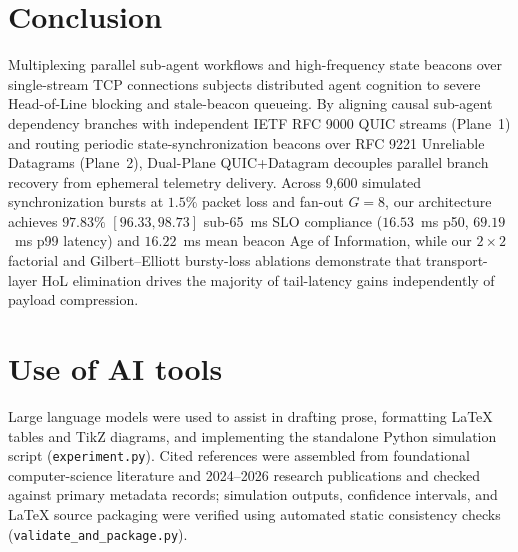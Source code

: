 \documentclass[11pt]{article}
\begin{document}
\section{Conclusion}\label{sec:conclusion}

Multiplexing parallel sub-agent workflows and high-frequency state beacons over single-stream TCP connections subjects distributed agent cognition to severe Head-of-Line blocking and stale-beacon queueing. By aligning causal sub-agent dependency branches with independent IETF RFC 9000 QUIC streams (Plane~1) and routing periodic state-synchronization beacons over RFC 9221 Unreliable Datagrams (Plane~2), Dual-Plane QUIC+Datagram decouples parallel branch recovery from ephemeral telemetry delivery. Across 9{,}600 simulated synchronization bursts at $1.5\%$ packet loss and fan-out $G=8$, our architecture achieves $97.83\%$ $[96.33, 98.73]$ sub-65~ms SLO compliance ($16.53$~ms p50, $69.19$~ms p99 latency) and $16.22$~ms mean beacon Age of Information, while our $2\times 2$ factorial and Gilbert--Elliott bursty-loss ablations demonstrate that transport-layer HoL elimination drives the majority of tail-latency gains independently of payload compression.

\section*{Use of AI tools}
Large language models were used to assist in drafting prose, formatting \LaTeX{} tables and TikZ diagrams, and implementing the standalone Python simulation script (\texttt{experiment.\linebreak[0]py}). Cited references were assembled from foundational computer-science literature and 2024--2026 research publications and checked against primary metadata records; simulation outputs, confidence intervals, and \LaTeX{} source packaging were verified using automated static consistency checks (\texttt{validate\_\linebreak[0]and\_\linebreak[0]package.\linebreak[0]py}).



\end{document}
